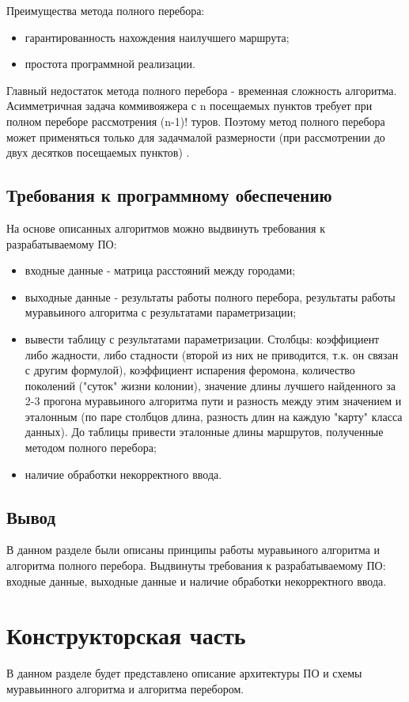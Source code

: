 \documentclass[12pt]{report}
\begin{document}
	Преимущества метода полного перебора:
	\begin{itemize}
		\item гарантированность нахождения наилучшего маршрута;
		\item простота программной реализации.
	\end{itemize}

	Главный недостаток метода полного перебора - временная сложность алгоритма.	
	Асимметричная задача коммивояжера с n посещаемых пунктов требует при полном переборе рассмотрения (n-1)! туров. Поэтому метод полного перебора может применяться только для задачмалой размерности (при рассмотрении до двух десятков посещаемых пунктов) \cite{4}.
	
	\section{Требования к программному обеспечению}
	На основе описанных алгоритмов можно выдвинуть требования к разрабатываемому ПО:
	\begin{itemize}
		\item входные данные - матрица расстояний между городами;
		\item выходные данные - результаты работы полного перебора, результаты работы муравьиного алгоритма с результатами параметризации;
		\item вывести таблицу с результатами параметризации. Столбцы: коэффициент либо жадности, либо стадности (второй из них не приводится, т.к. он связан с другим формулой), коэффициент испарения феромона, количество поколений ("суток" жизни колонии), значение длины лучшего найденного за 2-3 прогона муравьиного алгоритма пути и разность между этим значением и эталонным (по паре столбцов длина, разность длин на каждую "карту" класса данных). До таблицы привести эталонные длины маршрутов, полученные методом полного перебора;
		\item наличие обработки некорректного ввода.
	\end{itemize}
		
	
	\section*{Вывод}
	В данном разделе были описаны принципы работы муравьиного алгоритма и алгоритма полного перебора.
	Выдвинуты требования к разрабатываемому ПО: входные данные, выходные данные и наличие обработки некорректного ввода.
	\newpage
	
	\chapter{Конструкторская часть}
	В данном разделе будет представлено описание архитектуры ПО и схемы муравьинного алгоритма и алгоритма перебором.
	
\end{document}
